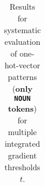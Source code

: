 \begin{table}[t]
\begin{tabular}{lllllll}

\hline
\end{tabular}
\caption[Model Evaluation for only \texttt{NOUN} tokens]{Results for systematic evaluation of one-hot-vector patterns (\textbf{only \texttt{NOUN} tokens}) for multiple integrated gradient thresholds $t$.}
\label{tab:evalResultsNOUN}
\end{table}
	